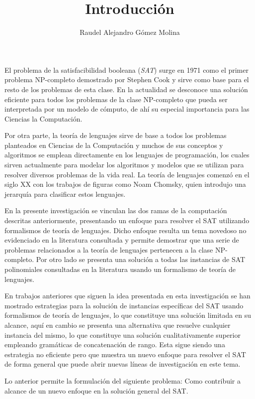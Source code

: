 \documentclass[12pt]{article}
\title{Introducción}
\author{Raudel Alejandro Gómez Molina}
\begin{document}
\maketitle

El problema de la satisfacibilidad booleana (\textit{SAT}) surge en 1971 como el primer problema NP-completo demostrado por
Stephen Cook y sirve como base para el resto de los problemas de esta clase. En la actualidad se desconoce una solución eficiente
para todos los problemas de la clase NP-completo que pueda ser interpretada por un modelo de cómputo,
de ahí su especial importancia para las Ciencias la Computación.

Por otra parte, la teoría de lenguajes sirve de base a todos los problemas planteados en Ciencias de la Computación y muchos
de sus conceptos y algoritmos se emplean directamente en los lenguajes de programación, los cuales sirven actualmente
para modelar los algoritmos y modelos que se utilizan para resolver diversos problemas de la vida real. La teoría de lenguajes comenzó
en el siglo XX con los trabajos de figuras como Noam Chomsky, quien introdujo una jerarquía para clasificar estos lenguajes.

En la presente investigación se vinculan las dos ramas de la computación descritas anteriormente, presentando un enfoque para resolver el SAT
utilizando formalismos de teoría de lenguajes. Dicho enfoque resulta un tema novedoso no evidenciado en la literatura consultada
y permite demostrar que una serie de problemas relacionados a la teoría de lenguajes pertenecen a la clase NP-completo. Por otro lado
se presenta una solución a todas las instancias de SAT polinomiales consultadas en la literatura usando un formalismo de teoría de
lenguajes.

En trabajos anteriores que siguen la idea presentada en esta investigación se han mostrado estrategias para la solución
de instancias específicas del SAT usando formalismos de teoría de lenguajes, lo que constituye una solución limitada en su alcance,
aquí en cambio se presenta una alternativa que resuelve cualquier instancia del mismo, lo que constituye una solución
cualitativamente superior empleando gramáticas de concatenación de rango. Esta sigue siendo una estrategia no eficiente pero que
muestra un nuevo enfoque para resolver el SAT de forma general que puede abrir nuevas líneas de investigación en este tema.

Lo anterior permite la formulación del siguiente problema: Como contribuir a alcance de un nuevo enfoque en la solución general del SAT.
\end{document}
